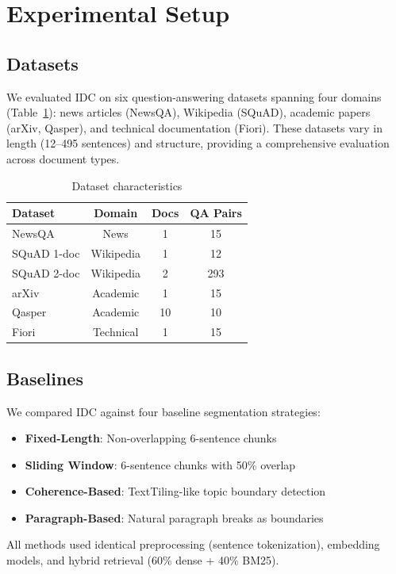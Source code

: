 \documentclass[conference]{IEEEtran}
\begin{document}
\section{Experimental Setup}

\subsection{Datasets}

We evaluated IDC on six question-answering datasets spanning four domains (Table~\ref{tab:datasets}): news articles (NewsQA), Wikipedia (SQuAD), academic papers (arXiv, Qasper), and technical documentation (Fiori). These datasets vary in length (12--495 sentences) and structure, providing a comprehensive evaluation across document types.

\begin{table}[h]
\centering
\caption{Dataset characteristics}
\label{tab:datasets}
\small
\begin{tabular}{lccc}
\toprule
\textbf{Dataset} & \textbf{Domain} & \textbf{Docs} & \textbf{QA Pairs} \\
\midrule
NewsQA & News & 1 & 15 \\
SQuAD 1-doc & Wikipedia & 1 & 12 \\
SQuAD 2-doc & Wikipedia & 2 & 293 \\
arXiv & Academic & 1 & 15 \\
Qasper & Academic & 10 & 10 \\
Fiori & Technical & 1 & 15 \\
\bottomrule
\end{tabular}
\end{table}

\subsection{Baselines}

We compared IDC against four baseline segmentation strategies:
\begin{itemize}
    \item \textbf{Fixed-Length}: Non-overlapping 6-sentence chunks
    \item \textbf{Sliding Window}: 6-sentence chunks with 50\% overlap
    \item \textbf{Coherence-Based}: TextTiling-like topic boundary detection
    \item \textbf{Paragraph-Based}: Natural paragraph breaks as boundaries
\end{itemize}
All methods used identical preprocessing (sentence tokenization), embedding models, and hybrid retrieval (60\% dense + 40\% BM25).
\end{document}
